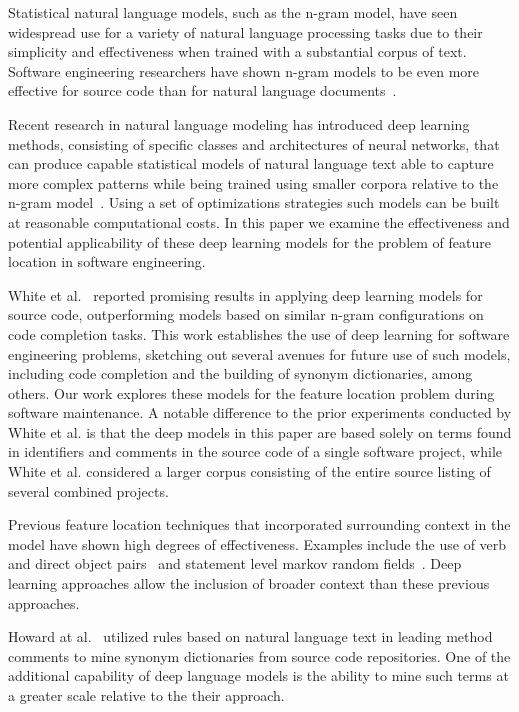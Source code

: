


%
%
Statistical natural language models, such as the n-gram model, have
seen widespread use for a variety of natural language processing tasks
due to their simplicity and effectiveness when trained with a
substantial corpus of text.  Software engineering researchers have
shown n-gram models to be even more effective for source code than for
natural language documents~\cite{hindle_naturalness_2012}. 


Recent research in natural language modeling has introduced deep learning
methods, consisting of specific classes and architectures of neural networks,
that can produce capable statistical models of natural language text able to
capture more complex patterns while being trained using smaller corpora relative
to the n-gram model~\cite{mikolov_distributed_2013,le_distributed_2014}. Using
a set of optimizations strategies such models can be built at reasonable
computational costs.  In this paper we examine the effectiveness and potential
applicability of these deep learning models for the problem of feature location
in software engineering.



White et al.~\cite{white_toward_2015} reported promising results in applying
deep learning models for source code, outperforming models based on similar
n-gram configurations on code completion tasks. This work establishes the use of
deep learning for software engineering problems, sketching out several avenues
for future use of such models, including code completion and the building of
synonym dictionaries, among others. Our work explores these models for the
feature location problem during software maintenance. A notable difference to
the prior experiments conducted by White et al. is that the deep models in this
paper are based solely on terms found in identifiers and comments in the source
code of a single software project, while White et al. considered a larger corpus
consisting of the entire source listing of several combined projects.



Previous feature location techniques that incorporated surrounding context in
the model have shown high degrees of effectiveness. Examples include the use of
verb and direct object pairs~\cite{shepherd_using_2007} and statement level
markov random fields~\cite{hill_use_2014}. Deep learning approaches allow the
inclusion of broader context than these previous approaches.

Howard at al.~\cite{howard_automatically_2013} utilized rules based on natural
language text in leading method comments to mine synonym dictionaries from
source code repositories. One of the additional capability of deep language
models is the ability to mine such terms at a greater scale relative to the
their approach.
